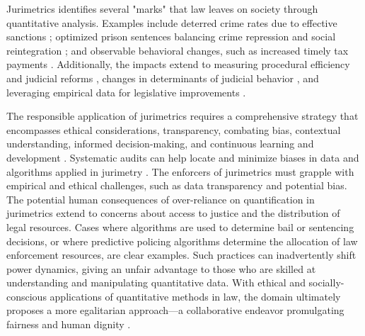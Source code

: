 Jurimetrics identifies several "marks" that law leaves on society through quantitative analysis. Examples include deterred crime rates due to effective sanctions \cite{nunes2016}; optimized prison sentences balancing crime repression and social reintegration \cite{nunes2016}; and observable behavioral changes, such as increased timely tax payments \cite{nunes2016}. Additionally, the impacts extend to measuring procedural efficiency and judicial reforms \cite{nunes2016}, changes in determinants of judicial behavior \cite{nunes2016}, and leveraging empirical data for legislative improvements \cite{nunes2016}.

The responsible application of jurimetrics requires a comprehensive strategy that encompasses ethical considerations, transparency, combating bias, contextual understanding, informed decision-making, and continuous learning and development \cite{10.1590/dados.2022.65.3.267,1023071190721}. Systematic audits can help locate and minimize biases in data and algorithms applied in jurimetry \cite{10.1590/dados.2022.65.3.267,1023071190721}. The enforcers of jurimetrics must grapple with empirical and ethical challenges, such as data transparency and potential bias. The potential human consequences of over-reliance on quantification in jurimetrics extend to concerns about access to justice and the distribution of legal resources. Cases where algorithms are used to determine bail or sentencing decisions, or where predictive policing algorithms determine the allocation of law enforcement resources, are clear examples. Such practices can inadvertently shift power dynamics, giving an unfair advantage to those who are skilled at understanding and manipulating quantitative data. With ethical and socially-conscious applications of quantitative methods in law, the domain ultimately proposes a more egalitarian approach—a collaborative endeavor promulgating fairness and human dignity \cite{10.1007/s11186-021-09453-1,international2015,10.3390/fi9040068,10.1080/07329113.2015.1046739,10.1590/15174522-105471,10.1590/dados.2022.65.3.267,1023071190721,10.2307/2654208,demortain2019politics,10.5040/9781350220645,10.1057/s41599-020-0396-5,10.1057/s41599-020-00557-0,comptabilitat0018,salais2016quantification,10.1017/s0003975609000150,10.1017/s0003975609000150,supiot2018,nunes2016jurimetrics,10.1007/s11186-021-09453-1,de2010jurimetrics,zabala2019decades}.

